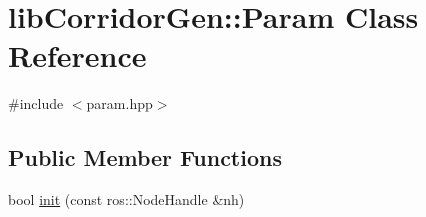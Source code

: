 \hypertarget{classlib_corridor_gen_1_1_param}{}\section{lib\+Corridor\+Gen\+:\+:Param Class Reference}
\label{classlib_corridor_gen_1_1_param}


{\ttfamily \#include $<$param.\+hpp$>$}

\subsection*{Public Member Functions}
\begin{DoxyCompactItemize}
\item 
bool \hyperlink{classlib_corridor_gen_1_1_param_aafe3d5fb62dfc1c9f8fb700d7a1c9c8c}{init} (const ros\+::\+Node\+Handle \&nh)
\end{DoxyCompactItemize}
